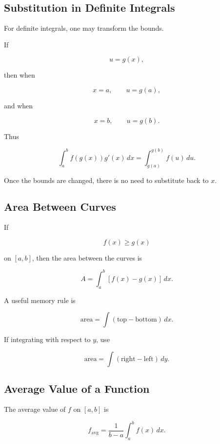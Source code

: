 \subsection{Substitution in Definite Integrals}
\label{subsec:definite-substitution}

For definite integrals, one may transform the bounds.

If

\[ u=g(x), \]

then when

\[ x=a,\qquad u=g(a), \]

and when

\[ x=b,\qquad u=g(b). \]

Thus

\[ \int_a^b f(g(x))g'(x)\,dx
=
\int_{g(a)}^{g(b)}f(u)\,du. \]

Once the bounds are changed, there is no need to substitute back to \(x\).

\subsection{Area Between Curves}
\label{subsec:area-between-curves}

If

\[ f(x)\geq g(x) \]

on \([a,b]\), then the area between the curves is

\[ A=\int_a^b[f(x)-g(x)]\,dx. \]

A useful memory rule is

\[ \boxed{\text{area}=\int(\text{top}-\text{bottom})\,dx.} \]

If integrating with respect to \(y\), use

\[ \boxed{\text{area}=\int(\text{right}-\text{left})\,dy.} \]

\subsection{Average Value of a Function}
\label{subsec:average-value}

The average value of \(f\) on \([a,b]\) is

\[ f_{\mathrm{avg}}
=
\frac1{b-a}\int_a^b f(x)\,dx. \]

